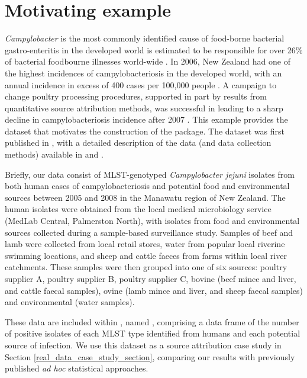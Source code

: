 \section{Motivating example}\label{sec:motivation}

\emph{Campylobacter} is the most commonly identified cause of food-borne bacterial gastro-enteritis in the developed world \citep{MilMan05} is estimated to be responsible for over 26\% of bacterial foodbourne illnesses world-wide \citep{HavEtAl2015}. %
In 2006, New Zealand had one of the highest incidences of campylobacteriosis in 
the developed world, with an annual incidence in excess of 400 cases per 100,000 people \citep{BakWilIkr06}.  A campaign to change poultry processing procedures, supported in part by results from 
quantitative source attribution methods, was successful in leading to a sharp decline in campylobacteriosis incidence after 2007 \citep{MulJonNob09}.  This example provides the dataset that motivates the construction of the  package.  The dataset was first published in \cite{MuelColMid10}, with a detailed description of the data (and data collection methods) available in \cite{FreMar09} and \cite{FreMar13}.  

Briefly, our data consist of MLST-genotyped \emph{Campylobacter jejuni} isolates from both human cases of campylobacteriosis and potential food and environmental sources 
between 2005 and 2008 in the Manawatu region of New Zealand.  The human isolates were obtained from the local medical microbiology service (MedLab 
Central, Palmerston North), with isolates from food and environmental sources collected during a sample-based surveillance study.  Samples of beef and lamb were collected from local retail stores, water from popular local riverine swimming locations, and sheep and cattle faeces from farms within local river catchments.  These samples 
were then grouped into one of six sources: poultry supplier A, poultry supplier B, poultry supplier C, bovine (beef mince and liver, and cattle faecal samples), ovine (lamb mince and liver, and sheep 
faecal samples) and environmental (water samples).   

These data are included within , named , comprising a data frame of the number of positive isolates of each MLST 
type identified from humans and each potential source of infection.  We use this dataset as a source attribution case study in Section \ref{real_data_case_study_section}, comparing our results with previously 
published \emph{ad hoc} statistical approaches.